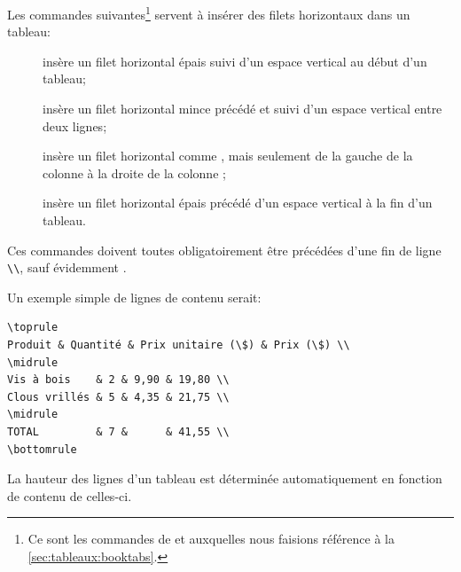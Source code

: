 \begin{list}{}
  Les commandes suivantes\footnote{%
    Ce sont les commandes de  et 
auxquelles nous faisions référence à la \autoref{sec:tableaux:booktabs}.} %
  servent à insérer des filets horizontaux dans un tableau:
  \begin{description}
  \item[\normalfont\cmd{\toprule}] insère un filet horizontal épais
    suivi d'un espace vertical au début d'un tableau;
  \item[\normalfont\cmd{\midrule}] insère un filet horizontal mince
    précédé et suivi d'un espace vertical entre deux lignes;
  \item[\normalfont{}] insère un filet
    horizontal comme \cmd{\midrule}, mais seulement de la gauche de la
    colonne  à la droite de la colonne ;
  \item[\normalfont\cmd{\bottomrule}] insère un filet horizontal épais
    précédé d'un espace vertical à la fin d'un tableau.
  \end{description}
  Ces commandes doivent toutes obligatoirement être précédées d'une
  fin de ligne \verb=\\=, sauf évidemment \cmd{\toprule}.

  Un exemple simple de lignes de contenu serait:
\begin{lstlisting}
\toprule
Produit & Quantité & Prix unitaire (\$) & Prix (\$) \\
\midrule
Vis à bois    & 2 & 9,90 & 19,80 \\
Clous vrillés & 5 & 4,35 & 21,75 \\
\midrule
TOTAL         & 7 &      & 41,55 \\
\bottomrule
\end{lstlisting}
\end{list}

La hauteur des lignes d'un tableau est déterminée automatiquement en
fonction de contenu de celles-ci.

